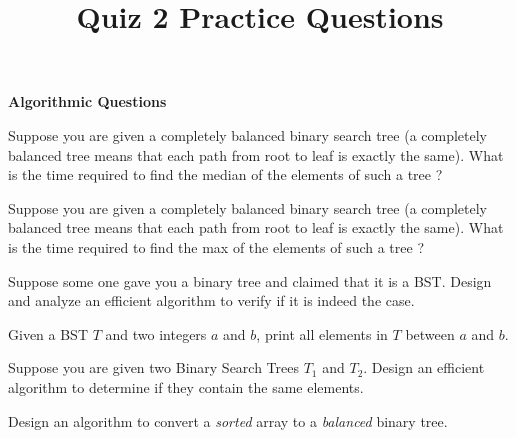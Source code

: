 \documentclass[addpoints,12pt]{exam}
\begin{document}
\title{Quiz 2 Practice Questions}
\author{}
\date{}
\maketitle

\newcommand{\hint}[1]{\\{\bf Hint:} {\em {#1}}}



\begin{center}
{\Large \textbf{Algorithmic Questions}}
\end{center}


\begin{questions}
\question
Suppose you are given a completely balanced binary search tree (a completely balanced tree 
means that each path from root to leaf is exactly the same). What is the time required to find the median
of the elements of such a tree ?

\question
Suppose you are given a completely balanced binary search tree (a completely balanced tree 
means that each path from root to leaf is exactly the same). What is the time required to find the max 
of the elements of such a tree ?

\question
Suppose some one gave you a binary tree and claimed that it is a BST. 
Design and analyze an efficient algorithm to verify if it is indeed the case.

\question
Given a BST $T$ and two integers $a$ and $b$, print all elements in $T$ between $a$ and $b$.

\question
Suppose you are given two Binary Search Trees $T_1$ and $T_2$. Design an efficient algorithm to determine if they contain the same elements.

\question
Design an algorithm to convert a {\em sorted} array to a {\em balanced} binary tree.

\end{questions}
\end{document}
